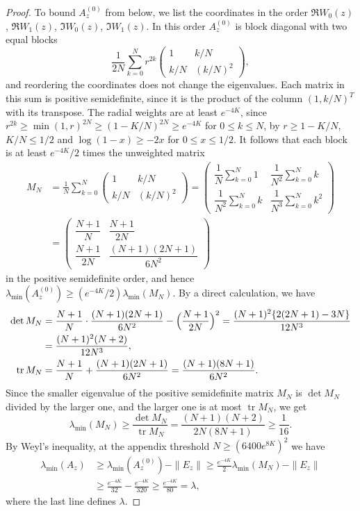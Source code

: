 \begin{proof}
To bound $A_z^{(0)}$ from below, we list the coordinates in the order
$\Re W_0(z)$, $\Re W_1(z)$, $\Im W_0(z)$, $\Im W_1(z)$. In this order
$A_z^{(0)}$ is block diagonal with two equal blocks
\[
 \frac1{2N}\sum_{k=0}^Nr^{2k}\begin{pmatrix}1&k/N\\k/N&(k/N)^2\end{pmatrix},
\]
and reordering the coordinates does not change the eigenvalues. Each matrix
in this sum is positive semidefinite, since it is the product of the column
$(1,k/N)^T$ with its transpose.
The radial weights are at least $e^{-4K}$, since
$r^{2k}\ge\min(1,r)^{2N}\ge(1-K/N)^{2N}\ge e^{-4K}$ for $0\le k\le N$, by
$r\ge1-K/N$, $K/N\le1/2$ and $\log(1-x)\ge-2x$ for $0\le x\le1/2$.
It follows that each block is at least $e^{-4K}/2$ times the unweighted
matrix
\begin{align*}
 M_N&=\frac1N\sum_{k=0}^N
 \begin{pmatrix}1&k/N\\k/N&(k/N)^2\end{pmatrix}
 =\begin{pmatrix}
 \dfrac1N\sum_{k=0}^N1&\dfrac1{N^2}\sum_{k=0}^Nk\\[8pt]
 \dfrac1{N^2}\sum_{k=0}^Nk&\dfrac1{N^3}\sum_{k=0}^Nk^2
 \end{pmatrix}\\
 &=\begin{pmatrix}
 \dfrac{N+1}{N}&\dfrac{N+1}{2N}\\[4pt]
 \dfrac{N+1}{2N}&\dfrac{(N+1)(2N+1)}{6N^2}
 \end{pmatrix}
\end{align*}
in the positive semidefinite order, and hence
$\lambda_{\min}(A_z^{(0)})\ge(e^{-4K}/2)\lambda_{\min}(M_N)$.
By a direct calculation, we have
\begin{align*}
 \det M_N&=\frac{N+1}N\cdot\frac{(N+1)(2N+1)}{6N^2}
   -\Bigl(\frac{N+1}{2N}\Bigr)^2
 =\frac{(N+1)^2\{2(2N+1)-3N\}}{12N^3}\\
 &=\frac{(N+1)^2(N+2)}{12N^3},\\
 \operatorname{tr}M_N&=\frac{N+1}N+\frac{(N+1)(2N+1)}{6N^2}
 =\frac{(N+1)(8N+1)}{6N^2}.
\end{align*}
Since the smaller eigenvalue of the positive semidefinite matrix $M_N$ is
$\det M_N$ divided by the larger one, and the larger one is at most
$\operatorname{tr}M_N$, we get
\[
 \lambda_{\min}(M_N)\ge\frac{\det M_N}{\operatorname{tr}M_N}
 =\frac{(N+1)(N+2)}{2N(8N+1)}
 \ge\frac1{16}.
\]
By Weyl's inequality, at the appendix threshold $N\ge(6400e^{8K})^2$ we
have
\begin{align}
 \lambda_{\min}(A_z)
 &\ge\lambda_{\min}(A_z^{(0)})-\|E_z\|
 \ge\frac{e^{-4K}}2\lambda_{\min}(M_N)-\|E_z\|\nonumber\\
 &\ge\frac{e^{-4K}}{32}-\frac{e^{-4K}}{320}
 \ge\frac{e^{-4K}}{80}
 =\lambda,\label{eq:jet-eigenvalue}
\end{align}
where the last line defines $\lambda$.


\end{proof}
